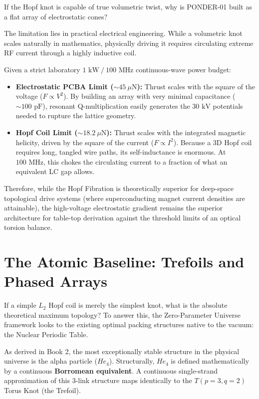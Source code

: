 If the Hopf knot is capable of true volumetric twist, why is PONDER-01 built as a flat array of electrostatic cones?

The limitation lies in practical electrical engineering. While a volumetric knot scales naturally in mathematics, physically driving it requires circulating extreme RF current through a highly inductive coil.

Given a strict laboratory $1 \text{ kW} \ / \ 100 \text{ MHz}$ continuous-wave power budget:
\begin{itemize}
    \item \textbf{Electrostatic PCBA Limit ($\sim 45 \ \mu \text{N}$):} Thrust scales with the square of the voltage ($F \propto V^2$). By building an array with very minimal capacitance ($\sim 100 \text{ pF}$), resonant Q-multiplication easily generates the $30 \text{ kV}$ potentials needed to rupture the lattice geometry.
    \item \textbf{Hopf Coil Limit ($\sim 18.2 \ \mu \text{N}$):} Thrust scales with the integrated magnetic helicity, driven by the square of the current ($F \propto I^2$). Because a 3D Hopf coil requires long, tangled wire paths, its self-inductance is enormous. At $100 \text{ MHz}$, this chokes the circulating current to a fraction of what an equivalent LC gap allows. 
\end{itemize}

Therefore, while the Hopf Fibration is theoretically superior for deep-space topological drive systems (where superconducting magnet current densities are attainable), the high-voltage electrostatic gradient remains the superior architecture for table-top derivation against the threshold limits of an optical torsion balance.

\section{The Atomic Baseline: Trefoils and Phased Arrays}

If a simple $L_2$ Hopf coil is merely the simplest knot, what is the absolute theoretical maximum topology? To answer this, the Zero-Parameter Universe framework looks to the existing optimal packing structures native to the vacuum: the Nuclear Periodic Table.

As derived in Book 2, the most exceptionally stable structure in the physical universe is the alpha particle ($He_4$). Structurally, $He_4$ is defined mathematically by a continuous \textbf{Borromean equivalent}. A continuous single-strand approximation of this $3$-link structure maps identically to the $T(p=3, q=2)$ Torus Knot (the Trefoil).


